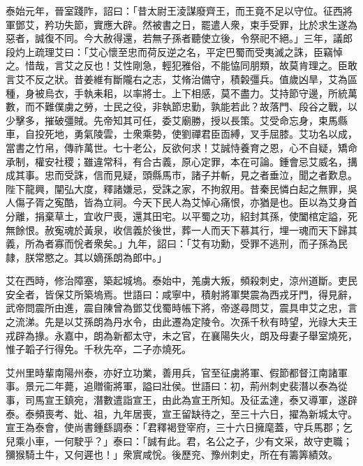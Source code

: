 \begin{pinyinscope}
泰始元年，晉室踐阼，詔曰：「昔太尉王淩謀廢齊王，而王竟不足以守位。征西將軍鄧艾，矜功失節，實應大辟。然被書之日，罷遣人衆，束手受罪，比於求生遂為惡者，誠復不同。今大赦得還，若無子孫者聽使立後，令祭祀不絕。」三年，議郎段灼上疏理艾曰：「艾心懷至忠而荷反逆之名，平定巴蜀而受夷滅之誅，臣竊悼之。惜哉，言艾之反也！艾性剛急，輕犯雅俗，不能恊同朋類，故莫肯理之。臣敢言艾不反之狀。昔姜維有斷隴右之志，艾脩治備守，積糓彊兵。值歲凶旱，艾為區種，身被烏衣，手執耒耜，以率將士。上下相感，莫不盡力。艾持節守邊，所統萬數，而不難僕虜之勞，士民之役，非執節忠勤，孰能若此？故落門、段谷之戰，以少擊多，摧破彊賊。先帝知其可任，委艾廟勝，授以長策。艾受命忘身，束馬縣車，自投死地，勇氣陵雲，士衆乘勢，使劉禪君臣靣縛，叉手屈膝。艾功名以成，當書之竹帛，傳祚萬世。七十老公，反欲何求！艾誠恃養育之恩，心不自疑，矯命承制，權安社稷；雖違常科，有合古義，原心定罪，本在可論。鍾會忌艾威名，搆成其事。忠而受誅，信而見疑，頭縣馬巿，諸子并斬，見之者垂泣，聞之者歎息。陛下龍興，闡弘大度，釋諸嫌忌，受誅之家，不拘叙用。昔秦民憐白起之無罪，吳人傷子胥之寃酷，皆為立祠。今天下民人為艾悼心痛恨，亦猶是也。臣以為艾身首分離，捐棄草土，宜收尸喪，還其田宅。以平蜀之功，紹封其孫，使闔棺定謚，死無餘恨。赦寃魂於黃泉，收信義於後世，葬一人而天下慕其行，埋一魂而天下歸其義，所為者寡而恱者衆矣。」九年，詔曰：「艾有功勳，受罪不逃刑，而子孫為民隷，朕常愍之。其以嫡孫朗為郎中。」

艾在西時，修治障塞，築起城塢。泰始中，羗虜大叛，頻殺刺史，涼州道斷。吏民安全者，皆保艾所築塢焉。世語曰：咸寧中，積射將軍樊震為西戎牙門，得見辭，武帝問震所由進，震自陳曾為鄧艾伐蜀時帳下將，帝遂尋問艾，震具申艾之忠，言之流涕。先是以艾孫朗為丹水令，由此遷為定陵令。次孫千秋有時望，光祿大夫王戎辟為掾。永嘉中，朗為新都太守，未之官，在襄陽失火，朗及母妻子舉室燒死，惟子韜子行得免。千秋先卒，二子亦燒死。

艾州里時輩南陽州泰，亦好立功業，善用兵，官至征虜將軍、假節都督江南諸軍事。景元二年薨，追贈衞將軍，謚曰壯侯。世語曰：初，荊州刺史裴潛以泰為從事，司馬宣王鎮宛，潛數遣詣宣王，由此為宣王所知。及征孟達，泰又導軍，遂辟泰。泰頻喪考、妣、祖，九年居喪，宣王留缺待之，至三十六日，擢為新城太守。宣王為泰會，使尚書鍾繇調泰：「君釋褐登宰府，三十六日擁麾蓋，守兵馬郡；乞兒乘小車，一何駛乎？」泰曰：「誠有此。君，名公之子，少有文采，故守吏職；獼猴騎土牛，又何遲也！」衆賔咸恱。後歷兖、豫州刺史，所在有籌筭績效。


\end{pinyinscope}